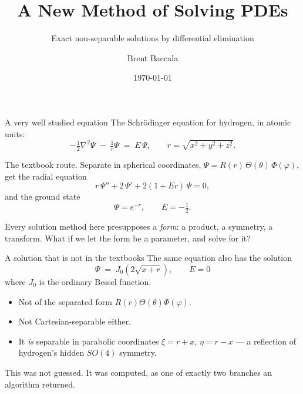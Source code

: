 \documentclass[10pt,aspectratio=169]{beamer}
\title{A New Method of Solving PDEs}
\subtitle{Exact non-separable solutions by differential elimination}
\author{Brent Baccala}
\date{\today}
\begin{document}
\maketitle


\begin{frame}{A very well studied equation}
The Schr\"odinger equation for hydrogen, in atomic units:
\[
  -\tfrac{1}{2}\nabla^{2}\Psi \;-\; \tfrac{1}{r}\Psi \;=\; E\,\Psi,
  \qquad r=\sqrt{x^{2}+y^{2}+z^{2}} .
\]

\pause
\alert{The textbook route.} Separate in spherical coordinates,
$\Psi = R(r)\,\Theta(\theta)\,\Phi(\varphi)$, get the radial equation
\[
  r\,\Psi'' + 2\,\Psi' + 2(1+Er)\,\Psi = 0,
\]
and the ground state
\[
  \Psi = e^{-r}, \qquad E = -\tfrac{1}{2}.
\]

\pause
\begin{alertblock}{}
Every solution method here presupposes a \emph{form}: a product, a symmetry, a
transform. What if we let the form be a parameter, and solve for it?
\end{alertblock}
\end{frame}

\begin{frame}{A solution that is not in the textbooks}
The same equation also has the solution
\[
  \boxed{\;\Psi \;=\; J_{0}\!\left(2\sqrt{x+r}\right), \qquad E = 0\;}
\]
where $J_{0}$ is the ordinary Bessel function.

\pause
\begin{itemize}
  \item Not of the separated form $R(r)\Theta(\theta)\Phi(\varphi)$.
  \item Not Cartesian-separable either.
  \item It \emph{is} separable in parabolic coordinates $\xi = r+x$,
        $\eta = r-x$ --- a reflection of hydrogen's hidden $SO(4)$ symmetry.
\end{itemize}

\pause
\bigskip
This was not guessed. It was \alert{computed}, as one of exactly two branches an
algorithm returned.
\end{frame}
\end{document}
